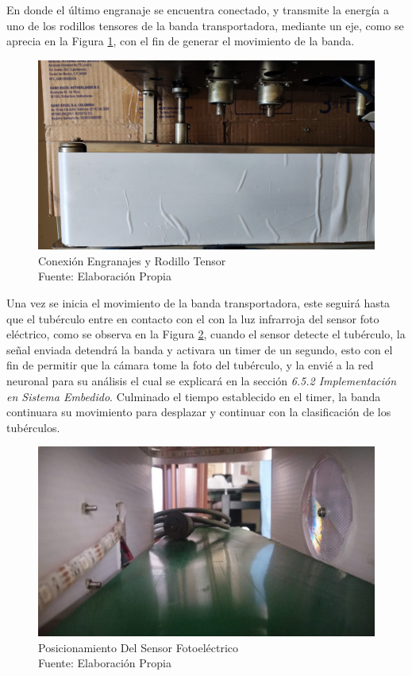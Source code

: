 En donde el último engranaje se encuentra conectado, y transmite la energía a uno de los rodillos tensores de la banda transportadora, mediante un eje, como se aprecia en la Figura \ref{fig:eje}, con el fin de generar el movimiento de la banda. 

\newpage
\begin{figure}[ht]
	\centering
	\includegraphics[angle=270, scale=0.3]{Figs/202.jpg}
	\caption{Conexión Engranajes y Rodillo Tensor\\Fuente: Elaboración Propia}
	\label{fig:eje}
\end{figure}


Una vez se inicia el movimiento de la banda transportadora, este seguirá hasta que el tubérculo entre en contacto con el con la luz infrarroja del sensor foto eléctrico, como se observa en la Figura \ref{fig:sensor}, cuando el sensor detecte el tubérculo, la señal enviada detendrá la banda y activara un timer de un segundo, esto con el fin de permitir que la cámara tome la foto del tubérculo, y la envié a la red neuronal para su análisis el cual se explicará en la sección \textit{6.5.2 Implementación en Sistema Embedido}. Culminado el tiempo establecido en el timer, la banda continuara su movimiento para desplazar y continuar con la clasificación de los tubérculos.

\begin{figure}[ht]
	\centering
	\includegraphics[scale=0.2]{Figs/203.jpg}
	\caption{Posicionamiento Del Sensor Fotoeléctrico\\Fuente: Elaboración Propia}
	\label{fig:sensor}
\end{figure}


